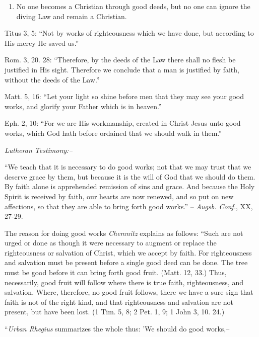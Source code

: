 \documentclass[
]{book}
\providecommand{\tightlist}{%
  \setlength{\itemsep}{0pt}\setlength{\parskip}{0pt}}
\begin{document}
\begin{enumerate}
\def\labelenumi{\alph{enumi}.}
\setcounter{enumi}{4}
\tightlist
\item
  No one becomes a Christian through good deeds, but no one can ignore the diving Law and remain a Christian.
\end{enumerate}

Titus 3, 5: ``Not by works of righteousness which we have done, but according to His mercy He saved us.''

Rom. 3, 20. 28: ``Therefore, by the deeds of the Law there shall no flesh be justified in His sight. Therefore we conclude that a man is justified by faith, without the deeds of the Law.''

Matt. 5, 16: ``Let your light so shine before men that they may see your good works, and glorify your Father which is in heaven.''

Eph. 2, 10: ``For we are His workmanship, created in Christ Jesus unto good works, which God hath before ordained that we should walk in them.''

\begin{center}
\textsl{Lutheran Testimony:--}
\end{center}

``We teach that it is necessary to do good works; not that we may trust that we deserve grace by them, but because it is the will of God that we should do them. By faith alone is apprehended remission of sins and grace. And because the Holy Spirit is received by faith, our hearts are now renewed, and so put on new affections, so that they are able to bring forth good works.'' -- \emph{Augsb. Conf.}, XX, 27-29.

The reason for doing good works \emph{Chemnitz} explains as follows: ``Such are not urged or done as though it were necessary to augment or replace the righteousness or salvation of Christ, which we accept by faith. For righteousness and salvation must be present before a single good deed can be done. The tree must be good before it can bring forth good fruit. (Matt. 12, 33.) Thus, necessarily, good fruit will follow where there is true faith, righteousness, and salvation. Where, therefore, no good fruit follows, there we have a sure sign that faith is not of the right kind, and that righteousness and salvation are not present, but have been lost. (1 Tim. 5, 8; 2 Pet. 1, 9; 1 John 3, 10. 24.)

``\emph{Urban Rhegius} summarizes the whole thus: 'We should do good works,--
\end{document}
